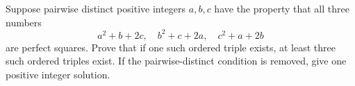 Suppose pairwise distinct positive integers $a,b,c$ have the property that all three numbers
\[
a^2+b+2c,\quad b^2+c+2a,\quad c^2+a+2b
\]
are perfect squares. Prove that if one such ordered triple exists, at least three such ordered triples exist. If the pairwise-distinct condition is removed, give one positive integer solution.
